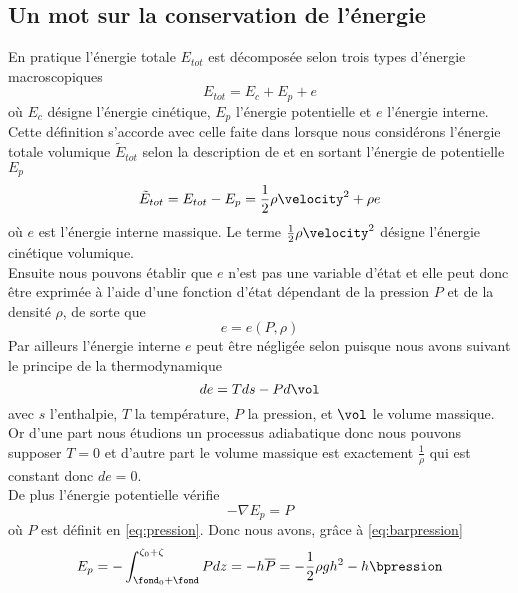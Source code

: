 \subsection{Un mot sur la conservation de l'énergie}
\noindent En pratique l'énergie totale $E_{tot}$ est décomposée selon trois types d'énergie macroscopiques
\begin{equation}
	E_{tot} = E_c + E_p + e
\end{equation}
où $E_{c}$ désigne l'énergie cinétique, $E_p$ l'énergie potentielle et $e$ l'énergie interne. Cette définition s'accorde avec celle faite dans \citet{leveque_numerical_1992} lorsque nous considérons l'énergie totale volumique $\tilde{E}_{tot}$ selon la description de \citet{leveque_numerical_1992} et en sortant l'énergie de potentielle $E_p$
\begin{equation}
	\tilde{E}_{tot} = E_{tot} - E_p = \frac{1}{2}\rho\velocity^2 + \rho e\label{eq:energytotale}
\end{equation}
où $e$ est l'énergie interne massique. Le terme $\frac{1}{2}\rho\velocity^2$ désigne l'énergie cinétique volumique.\\
Ensuite nous pouvons établir que $e$ n'est pas une variable d'état et elle peut donc être exprimée à l'aide d'une fonction d'état dépendant de la pression $P$ et de la densité $\rho$, de sorte que
\begin{equation}
	e = e\left(P, \rho\right) \label{eq:energyintern}
\end{equation}
Par ailleurs l'énergie interne $e$ peut être négligée selon \citet{vallis_atmospheric_2006} puisque nous avons suivant le principe de la thermodynamique 
\begin{equation}
	de = Tds-Pd\vol\label{eq:firstlawthermo}
\end{equation}
avec $s$ l'enthalpie, $T$ la température, $P$ la pression, et $\vol$ le volume massique. Or d'une part nous étudions un processus adiabatique donc nous pouvons supposer $T = 0$ et d'autre part le volume massique est exactement $\frac{1}{\rho}$ qui est constant donc $de =0$.\\
De plus l'énergie potentielle vérifie
\begin{equation}
	-\nabla E_p = P
\end{equation}
où $P$ est définit en \eqref{eq:pression}. Donc nous avons, grâce à \eqref{eq:barpression}
\begin{equation}
	E_p = -\int_{\fond_0 + \fond}^{\zeta_0+\zeta} P dz= -h\overline{P} = -\frac{1}{2}\rho g h^2 -h\bpression
\end{equation}

